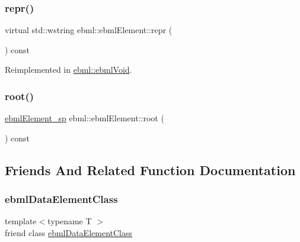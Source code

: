 \subsubsection{\texorpdfstring{repr()}{repr()}}
{\footnotesize\ttfamily virtual std\+::wstring ebml\+::ebml\+Element\+::repr (\begin{DoxyParamCaption}{ }\end{DoxyParamCaption}) const\hspace{0.3cm}{\ttfamily [virtual]}}



Reimplemented in \mbox{\hyperlink{classebml_1_1ebmlVoid_a54f5a77bc4029d77d0a456fa8dcb53ef}{ebml\+::ebml\+Void}}.

\mbox{\label{classebml_1_1ebmlElement_a9c9ed1823c036c8a77a64c68e12e769f}} 
\subsubsection{\texorpdfstring{root()}{root()}}
{\footnotesize\ttfamily \mbox{\hyperlink{namespaceebml_adad533b7705a16bb360fe56380c5e7be}{ebml\+Element\+\_\+sp}} ebml\+::ebml\+Element\+::root (\begin{DoxyParamCaption}{ }\end{DoxyParamCaption}) const}



\subsection{Friends And Related Function Documentation}
\mbox{\label{classebml_1_1ebmlElement_a1c651a685300ab8a612d148db28c6b1f}} 
\subsubsection{\texorpdfstring{ebml\+Data\+Element\+Class}{ebmlDataElementClass}}
{\footnotesize\ttfamily template$<$typename T $>$ \\
friend class \mbox{\hyperlink{classebml_1_1ebmlDataElementClass}{ebml\+Data\+Element\+Class}}\hspace{0.3cm}{\ttfamily [friend]}}

